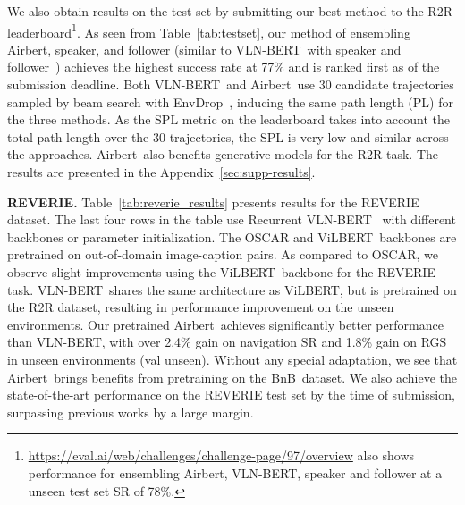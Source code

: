 \RequirePackage[dvipsnames,table]{xcolor} \documentclass[10pt,twocolumn,letterpaper]{article}
\newcommand{\p}[1]{\vspace{1mm}\noindent\textbf{#1}}
\newcommand{\vilbert}{ViLBERT}
\newcommand{\vlnbert}{VLN-BERT}
\newcommand{\airbert}{Airbert}
\newcommand{\airbnb}{BnB}
\begin{document}
We also obtain results on the test set by submitting our best method to the R2R leaderboard\footnote{\url{https://eval.ai/web/challenges/challenge-page/97/overview} also shows performance for ensembling \airbert, \vlnbert, speaker and follower at a unseen test set SR of 78\%.}.
As seen from Table~\ref{tab:testset}, our method of ensembling \airbert, speaker, and follower (similar to \vlnbert~with speaker and follower~\cite{devlin2018bert}) achieves the highest success rate at 77\% and is ranked first as of the submission deadline.
Both \vlnbert~and \airbert~use 30 candidate trajectories sampled by beam search with EnvDrop~\cite{tan2019envdrop}, inducing the same path length (PL) for the three methods. As the SPL metric on the leaderboard takes into account the total path length over the 30 trajectories, the SPL is very low and similar across the approaches. 
\airbert~also benefits generative models for the R2R task. The results are presented in the Appendix~\ref{sec:supp-results}.



\p{REVERIE.}
Table~\ref{tab:reverie_results} presents results for the REVERIE dataset.
The last four rows in the table use Recurrent \vlnbert~\cite{hong2021recurrentvln} with different backbones or parameter initialization.
The OSCAR and \vilbert~backbones are pretrained on out-of-domain image-caption pairs.
As compared to OSCAR, we observe slight improvements using the \vilbert~backbone for the REVERIE task.
\vlnbert~shares the same architecture as \vilbert, but is pretrained on the R2R dataset, resulting in performance improvement on the unseen environments.
Our pretrained \airbert~achieves significantly better performance than \vlnbert, with over 2.4\% gain on navigation SR and 1.8\% gain on RGS in unseen environments (val unseen).
Without any special adaptation, we see that \airbert~brings benefits from pretraining on the \airbnb~dataset.
We also achieve the state-of-the-art performance on the REVERIE test set by the time of submission, surpassing previous works by a large margin.
\end{document}
